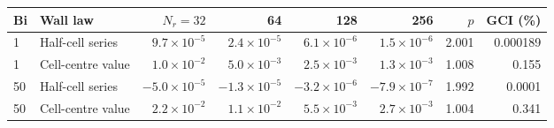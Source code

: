 \begin{tabular}{llrrrrrr}
\toprule
Bi & Wall law & $N_r=32$ & 64 & 128 & 256 & $p$ & GCI (\%) \\
\midrule
1 & Half-cell series & $9.7\times10^{-5}$ & $2.4\times10^{-5}$ & $6.1\times10^{-6}$ & $1.5\times10^{-6}$ & 2.001 & 0.000189 \\
1 & Cell-centre value & $1.0\times10^{-2}$ & $5.0\times10^{-3}$ & $2.5\times10^{-3}$ & $1.3\times10^{-3}$ & 1.008 & 0.155 \\
\midrule
50 & Half-cell series & $-5.0\times10^{-5}$ & $-1.3\times10^{-5}$ & $-3.2\times10^{-6}$ & $-7.9\times10^{-7}$ & 1.992 & 0.0001 \\
50 & Cell-centre value & $2.2\times10^{-2}$ & $1.1\times10^{-2}$ & $5.5\times10^{-3}$ & $2.7\times10^{-3}$ & 1.004 & 0.341 \\
\bottomrule
\end{tabular}
